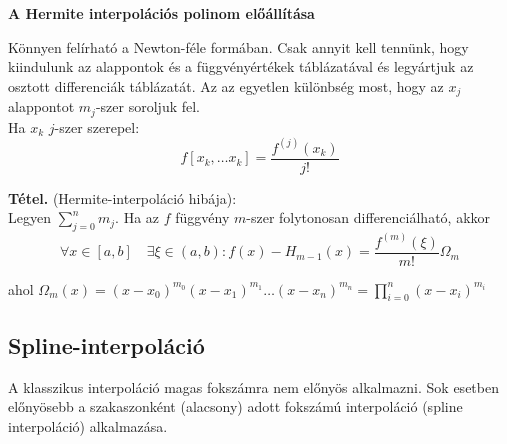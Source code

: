 \documentclass[tikz,12pt,margin=0px]{article}
\newcommand\ddfrac[2]{\frac{\displaystyle #1}{\displaystyle #2}}
\begin{document}
	\noindent \textbf{A Hermite interpolációs polinom előállítása\\}

    \noindent Könnyen felírható a Newton-féle formában. Csak annyit
	kell tennünk, hogy kiindulunk az alappontok és a függvényértékek táblázatával és legyártjuk az osztott differenciák
	táblázatát. Az az egyetlen különbség most, hogy az $x_{j}$ alappontot $m_{j}$-szer soroljuk fel.\\

	\noindent Ha $x_{k}$ $j$-szer szerepel:
	\begin{displaymath}
		f[x_{k}, \ldots x_{k}] = \ddfrac{f^{(j)}(x_{k})}{j!}
	\end{displaymath}
	
	\noindent \textbf{Tétel.} (Hermite-interpoláció hibája): \\
    Legyen $\sum\limits_{j=0}^{n}m_{j}$. Ha az $f$ függvény $m$-szer folytonosan differenciálható, akkor
	\begin{displaymath}
		\forall x \in [a,b] \quad \exists \xi \in (a, b): f(x) - H_{m-1}(x) = \ddfrac{f^{(m)}(\xi)}{m!}\Omega_{m}
	\end{displaymath}
	
	\noindent ahol $\Omega_{m}(x) = (x-x_{0})^{m_{0}}(x-x_{1})^{m_{1}}\ldots(x-x_{n})^{m_{n}} = \prod\limits_{i=0}^{n}(x - x_{i})^{m_{i}}$

	\subsection*{Spline-interpoláció}
	
    \noindent A klasszikus interpoláció magas fokszámra nem előnyös alkalmazni. Sok esetben előnyösebb a szakaszonként (alacsony) adott fokszámú interpoláció (spline interpoláció) alkalmazása.\\
\end{document}
